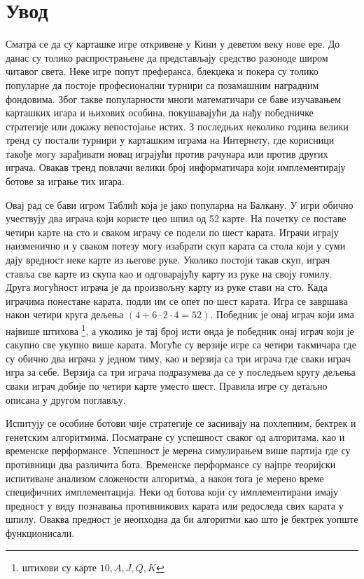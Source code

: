 \documentclass[a4paper, 12pt, ngerman]{article}
\let\oldsection\section
\renewcommand\section{\clearpage\oldsection}
\begin{document}
\pagebreak
\tableofcontents
\pagebreak

\section{Увод}
Сматра се да су карташке игре откривене у Кини у деветом веку нове ере. До данас су толико распрострањене да представљају средство разоноде широм читавог света. Неке игре попут преферанса, блекџека и покера су толико популарне да постоје професионални турнири са позамашним наградним фондовима. Због такве популарности многи математичари се баве изучавањем карташких игара и њихових особина, покушавајући да нађу победничке стратегије или докажу непостојање истих. З последњих неколико година велики тренд су постали турнири у карташким играма на Интернету, где корисници такође могу зарађивати новац играјући против рачунара или против других играча. Овакав тренд повлачи велики број информатичара који имплементирају ботове за играње тих игара.

Овај рад се бави игром Таблић која је јако популарна на Балкану. У игри обично учествују два играча који користе цео шпил од 52 карте. На почетку се поставе четири карте на сто и сваком играчу се подели по шест карата. Играчи играју наизменично и у сваком потезу могу изабрати скуп карата са стола који у суми дају вредност неке карте из његове руке. Уколико постоји такав скуп, играч ставља све карте из скупа као и одговарајућу карту из руке на своју гомилу. Друга могућност играча је да произвољну карту из руке стави на сто. Када играчима понестане карата, подли им се опет по шест карата. Игра се завршава након четири круга дељења $(4 + 6 \cdot 2 \cdot 4 = 52)$. Победник је онај играч који има највише штихова \footnote{штихови су карте $10, A, J, Q, K$}, а уколико је тај број исти онда је победник онај играч који је сакупио све укупно више карата. Могуће су верзије игре са четири такмичара где су обично два играча у једном тиму, као и верзија са три играча где сваки играч игра за себе. Верзија са три играча подразумева да се у последњем кругу дељења сваки играч добије по четири карте уместо шест. Правила игре су детаљно описана у другом поглављу.

Испитују се особине ботови чије стратегије се заснивају на похлепним, бектрек и генетским алгоритмима. Посматране су успешност сваког од алгоритама, као и временске перформансе. Успешност је мерена симулирањем више партија где су противници два различита бота. Временске перформансе су најпре теоријски испитиване анализом сложености алгоритма, а након тога је мерено време специфичних имплементација. Неки од ботова који су имплементирани имају предност у виду познавања противникових карата или редоследа свих карата у шпилу. Оваква предност је неопходна да би алгоритми као што је бектрек уопште функционисали.
\end{document}
